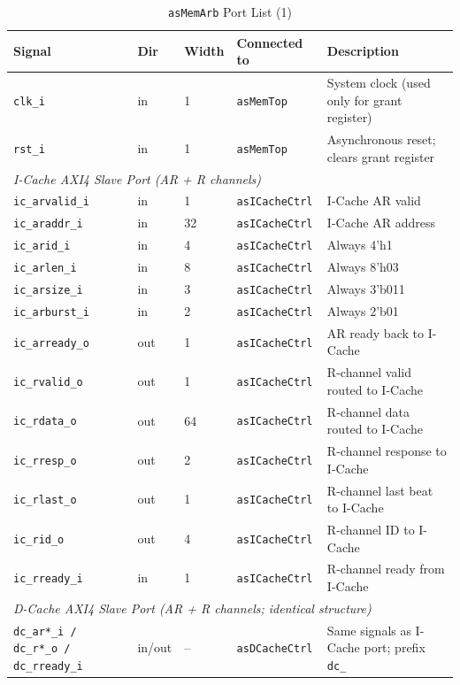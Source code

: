 \begin{table}[H]
\caption{\texttt{asMemArb} Port List (1)}
\label{tab:asMemArbPorts}
\centering
\begin{tabularx}{\textwidth}{|X |l |l |X |X|}
  \hline
  Signal & Dir & Width & Connected to & Description \\
  \hline
  \hline
  \texttt{clk\_i}  & in & 1 & \texttt{asMemTop} & System clock (used only for grant register) \\
  \hline
  \texttt{rst\_i}  & in & 1 & \texttt{asMemTop} & Asynchronous reset; clears grant register \\
  \hline
  \multicolumn{5}{|l|}{\textit{I-Cache AXI4 Slave Port (AR + R channels)}} \\
  \hline
  \texttt{ic\_arvalid\_i} & in  & 1  & \texttt{asICacheCtrl} & I-Cache AR valid \\
  \hline
  \texttt{ic\_araddr\_i}  & in  & 32 & \texttt{asICacheCtrl} & I-Cache AR address \\
  \hline
  \texttt{ic\_arid\_i}    & in  & 4  & \texttt{asICacheCtrl} & Always 4'h1 \\
  \hline
  \texttt{ic\_arlen\_i}   & in  & 8  & \texttt{asICacheCtrl} & Always 8'h03 \\
  \hline
  \texttt{ic\_arsize\_i}  & in  & 3  & \texttt{asICacheCtrl} & Always 3'b011 \\
  \hline
  \texttt{ic\_arburst\_i} & in  & 2  & \texttt{asICacheCtrl} & Always 2'b01 \\
  \hline
  \texttt{ic\_arready\_o} & out & 1  & \texttt{asICacheCtrl} & AR ready back to I-Cache \\
  \hline
  \texttt{ic\_rvalid\_o}  & out & 1  & \texttt{asICacheCtrl} & R-channel valid routed to I-Cache \\
  \hline
  \texttt{ic\_rdata\_o}   & out & 64 & \texttt{asICacheCtrl} & R-channel data routed to I-Cache \\
  \hline
  \texttt{ic\_rresp\_o}   & out & 2  & \texttt{asICacheCtrl} & R-channel response to I-Cache \\
  \hline
  \texttt{ic\_rlast\_o}   & out & 1  & \texttt{asICacheCtrl} & R-channel last beat to I-Cache \\
  \hline
  \texttt{ic\_rid\_o}     & out & 4  & \texttt{asICacheCtrl} & R-channel ID to I-Cache \\
  \hline
  \texttt{ic\_rready\_i}  & in  & 1  & \texttt{asICacheCtrl} & R-channel ready from I-Cache \\
  \hline
  \multicolumn{5}{|l|}{\textit{D-Cache AXI4 Slave Port (AR + R channels; identical structure)}} \\
  \hline
  \texttt{dc\_ar*\_i / dc\_r*\_o / dc\_rready\_i} & in/out & -- & \texttt{asDCacheCtrl} & Same signals as I-Cache port; prefix \texttt{dc\_} \\
  \hline
\end{tabularx}
\end{table}


